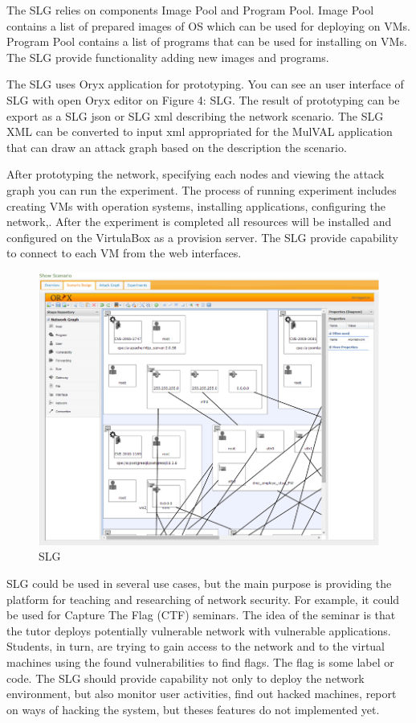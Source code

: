 The SLG relies on components Image Pool and Program Pool. Image Pool contains a list of prepared images of OS which can be used for deploying on VMs. Program Pool contains a list of programs that can be used for installing on VMs. The SLG provide functionality adding new images and programs.  

The SLG uses Oryx application for prototyping. You can see an user interface of SLG with open Oryx editor on Figure 4: SLG. The result of prototyping can be export as a SLG json or SLG xml describing the network scenario. The SLG XML can be converted to input xml appropriated for the MulVAL application that can draw an attack graph based on the description the scenario. 

After prototyping the network, specifying each nodes and viewing the attack graph you can run the experiment. The process of running experiment includes creating VMs with operation systems, installing applications, configuring the network,. After the experiment is completed all resources will be installed and configured on the VirtulaBox as a provision server. The SLG provide capability to connect to each VM from the web interfaces. 

\begin{figure}[ht!]
\centering
\includegraphics[width=\textwidth]{slg.png}
\caption{SLG}
\label{overflow}
\end{figure}



SLG could be used in several use cases, but the main purpose is providing the platform for teaching and researching of network security. For example, it could be used for Capture The Flag (CTF) seminars. The idea of the seminar is that the tutor deploys potentially vulnerable network with vulnerable applications. Students, in turn, are trying to gain access to the network and to the virtual machines using the found vulnerabilities to find flags. The flag is some label or code. The SLG should provide capability not only to deploy the network environment, but also monitor user activities, find out hacked machines, report on ways of hacking the system, but theses features do not implemented yet. 
  
